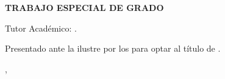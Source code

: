 \thispagestyle{empty}

\begin{center}
	    \changefontsizes{14pt}
		{\normalfont\bfseries \MakeUppercase{Trabajo Especial de Grado}}

	\vspace{9 cm}

        \changefontsizes{14pt}
		{\normalfont\bfseries \MakeUppercase{\tesis}}

\end{center}

\vspace{5cm}

Tutor Académico: \tutor.

\vspace{2cm}
\hspace{6cm}
\begin{minipage}[t]{8.5cm}
       \changefontsizes{12pt} 
		Presentado ante la ilustre \universidad \space por los
		\autor \space para optar al título de \titulo.

\end{minipage}

\vspace{1cm}

\begin{center}
	\ciudad, \the\year
\end{center}
